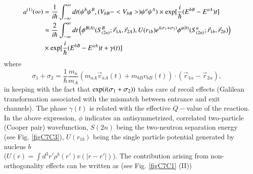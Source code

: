 \begin{subappendices}
\begin{equation}\label{eq7.C.4}
\begin{split}
a^{(1)} (\infty)& = \frac{1}{i \hbar} \int^{\infty}_{-\infty} dt (\psi^b \psi^B, (V_{bB} - <V_{bB}>) \psi^a \psi^A ) \times 
{\rm exp} [\frac{i}{\hbar} (E^{bB} - E^{aA}) t]  \\
&\approx \frac{2}{i \hbar} \int^{\infty}_{- \infty}  dt \left( \phi^{B(A)} (S^B_{(2n)}; \vec r_{1A}, \vec r_{2A}), U(r_{1b}) 
e^{i (\sigma_1 + \sigma_2)}
\phi^{a(b)} (S^a_{(2n)}; \vec r_{1b}, \vec r_{2b}) \right)\\
&\times {\rm exp} [\frac{i}{\hbar} (E^{bB} - E^{aA}) t + \gamma(t)] 
\end{split}
\end{equation}
where 
\begin{equation}
\sigma_1 + \sigma_2 = \frac{1}{\hbar} \frac{m_n}{m_A} ( m_{aA} \vec v_{aA} (t) + m_{bB} v_{bB}(t)) \cdot (\vec r_{1\alpha}
-\vec r_{2 \alpha}),
\end{equation}
in keeping with the fact that ${\rm exp} ( i (\sigma_1 + \sigma_2))$ takes care of recoil 
effects (Galilean transformation associated with the mismatch between entrance and exit channels). 
The phase $\gamma (t)$ is related  with the effective $Q-$value of the reaction. In the above expression, $\phi$ indicates an antisymmetrized, correlated two-particle (Cooper pair)  wavefunction, $S(2n)$ being the two-neutron separation energy (see Fig. \ref{figC7C3}), $U(r_{1b})$ being the single particle potential generated by nucleus $b$\\ (\mbox{$U(r) = \int d^3 r' \rho^b(r') v(|r-r'|)$}). The contribution arising from non-orthogonality effects can be written as (see Fig. \ref{figC7C1} (II))


\end{subappendices}
